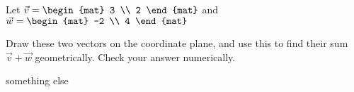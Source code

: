 
\begin{Exercise}[
name={},
title={}, 
difficulty=0,
origin={\cite{SM}}]
Let $\vec{v} = \begin{mat} 3 \\ 2 \end{mat}$ and $\vec{w} = \begin{mat} -2  \\ 4 \end{mat}$
 
Draw these two vectors on the coordinate plane, and use this to find their sum $\vec{v}+\vec{w}$ geometrically. Check your answer numerically.
\end{Exercise}

\begin{Answer}something else
%                
\end{Answer}
